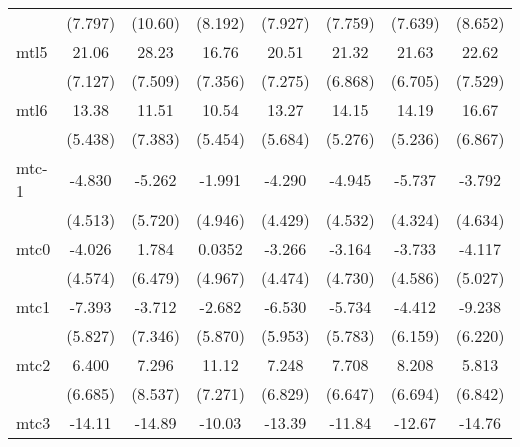 \documentclass{article}
\begin{document}
{\begin{longtable}{l*{7}{c}}
                &  (7.797)         &  (10.60)         &  (8.192)         &  (7.927)         &  (7.759)         &  (7.639)         &  (8.652)         \\
mtl5            &    21.06\sym{**} &    28.23\sym{***}&    16.76\sym{*}  &    20.51\sym{**} &    21.32\sym{**} &    21.63\sym{**} &    22.62\sym{**} \\
                &  (7.127)         &  (7.509)         &  (7.356)         &  (7.275)         &  (6.868)         &  (6.705)         &  (7.529)         \\
mtl6            &    13.38\sym{*}  &    11.51         &    10.54         &    13.27\sym{*}  &    14.15\sym{*}  &    14.19\sym{*}  &    16.67\sym{*}  \\
                &  (5.438)         &  (7.383)         &  (5.454)         &  (5.684)         &  (5.276)         &  (5.236)         &  (6.867)         \\
mtc-1           &   -4.830         &   -5.262         &   -1.991         &   -4.290         &   -4.945         &   -5.737         &   -3.792         \\
                &  (4.513)         &  (5.720)         &  (4.946)         &  (4.429)         &  (4.532)         &  (4.324)         &  (4.634)         \\
mtc0            &   -4.026         &    1.784         &   0.0352         &   -3.266         &   -3.164         &   -3.733         &   -4.117         \\
                &  (4.574)         &  (6.479)         &  (4.967)         &  (4.474)         &  (4.730)         &  (4.586)         &  (5.027)         \\
mtc1            &   -7.393         &   -3.712         &   -2.682         &   -6.530         &   -5.734         &   -4.412         &   -9.238         \\
                &  (5.827)         &  (7.346)         &  (5.870)         &  (5.953)         &  (5.783)         &  (6.159)         &  (6.220)         \\
mtc2            &    6.400         &    7.296         &    11.12         &    7.248         &    7.708         &    8.208         &    5.813         \\
                &  (6.685)         &  (8.537)         &  (7.271)         &  (6.829)         &  (6.647)         &  (6.694)         &  (6.842)         \\
mtc3            &   -14.11\sym{*}  &   -14.89         &   -10.03         &   -13.39\sym{*}  &   -11.84         &   -12.67         &   -14.76\sym{*}  \\

\end{longtable}}
\end{document}
